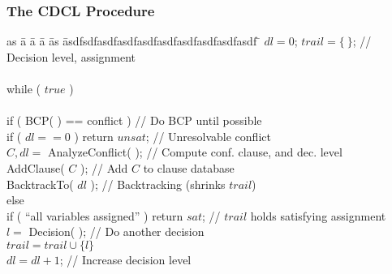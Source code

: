 \begin{frame}
  \frametitle{The CDCL Procedure}

  \scriptsize

  \vfill

  \begin{tabbing}
  as \= a \= a \= a \= as \= asdfsdfasdfasdfasdfasdfasdfasdfasdfasdf \= \kill
  \> $dl = 0$; $trail = \{\ \}$;                              \> \> \> \> \> // Decision level, assignment\\ \\
  \> while ( $true$ ) \\ \\
  \> \> if ( BCP( ) == conflict )                                \> \> \> \> // Do BCP until possible \\
  \> \> \> if ( $dl == 0$ ) return $unsat$;                         \> \> \> // Unresolvable conflict \\
  \> \> \> $C,dl =$ {\sc AnalyzeConflict}( );                           \> \> \> // Compute conf. clause, and dec. level \\
  \> \> \> {\sc AddClause}( $C$ );                                      \> \> \> // Add $C$ to clause database \\
  \> \> \> {\sc BacktrackTo}( $dl$ );                                   \> \> \> // Backtracking (shrinks $trail$) \\
  \> \> else \\
  \> \> \> if ( ``all variables assigned'' ) return $sat$;          \> \> \> // $trail$ holds satisfying assignment \\
  \> \> \> $l = $ {\sc Decision}( );                                      \> \> \> // Do another decision \\
  \> \> \> $trail = trail \cup \{ l \}$ \\                          
  \> \> \> $dl = dl + 1$;                                           \> \> \> // Increase decision level \\
  \end{tabbing}

  \vfill

\end{frame}

